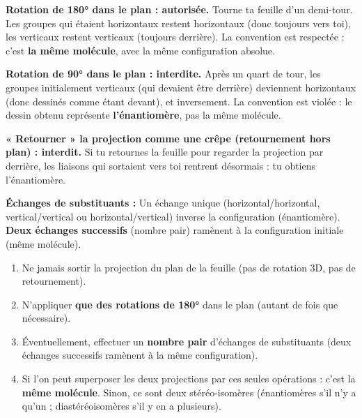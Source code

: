 \documentclass[11pt]{article}
\begin{document}
\textbf{Rotation de 180° dans le plan : autorisée.} Tourne ta feuille d'un demi-tour. Les groupes qui étaient horizontaux restent horizontaux (donc toujours vers toi), les verticaux restent verticaux (toujours derrière). La convention est respectée : c'est \textbf{la même molécule}, avec la même configuration absolue.

\textbf{Rotation de 90° dans le plan : interdite.} Après un quart de tour, les groupes initialement verticaux (qui devaient être derrière) deviennent horizontaux (donc dessinés comme étant devant), et inversement. La convention est violée : le dessin obtenu représente \textbf{l'énantiomère}, pas la même molécule.

\textbf{« Retourner » la projection comme une crêpe (retournement hors plan) : interdit.} Si tu retournes la feuille pour regarder la projection par derrière, les liaisons qui sortaient vers toi rentrent désormais : tu obtiens l'énantiomère.

\textbf{Échanges de substituants :} Un échange unique (horizontal/horizontal, vertical/vertical ou horizontal/vertical) inverse la configuration (énantiomère). \textbf{Deux échanges successifs} (nombre pair) ramènent à la configuration initiale (même molécule).

\begin{methode}
\begin{enumerate}
\item Ne jamais sortir la projection du plan de la feuille (pas de rotation 3D, pas de retournement).
\item N'appliquer \textbf{que des rotations de 180°} dans le plan (autant de fois que nécessaire).
\item Éventuellement, effectuer un \textbf{nombre pair} d'échanges de substituants (deux échanges successifs ramènent à la même configuration).
\item Si l'on peut superposer les deux projections par ces seules opérations : c'est la \textbf{même molécule}. Sinon, ce sont deux stéréo-isomères (énantiomères s'il n'y a qu'un  ; diastéréoisomères s'il y en a plusieurs).
\end{enumerate}
\end{methode}
\end{document}
